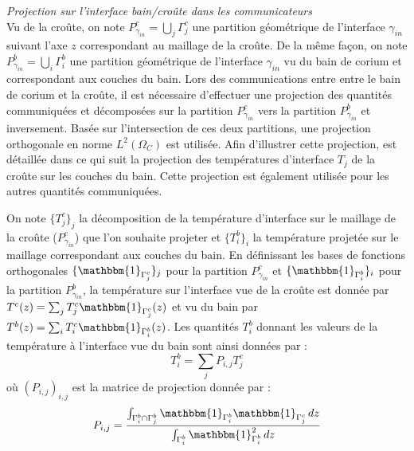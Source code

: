 {\it Projection sur l'interface bain/croûte dans les communicateurs}\\
Vu de la croûte, on note $P_{\gamma_{in}}^{c}=\displaystyle{\bigcup_j} \Gamma_j^c$ une partition géométrique de l'interface $\gamma_{in}$ suivant l'axe $z$ correspondant au maillage de la croûte. De la même façon, on note $P_{\gamma_{in}}^{b}=\displaystyle{\bigcup_i} \Gamma_i^b$ une partition géométrique de l'interface $\gamma_{in}$ vu du bain de corium et correspondant aux couches du bain. Lors des communications entre entre le bain de corium et la croûte, il est nécessaire d'effectuer une projection des quantités communiquées et décomposées sur la partition $P_{\gamma_{in}}^{c}$ vers la partition $P_{\gamma_{in}}^{b}$ et inversement. Basée sur l'intersection de ces deux partitions, une projection orthogonale en norme $L^2(\Omega_C)$ est utilisée. Afin d'illustrer cette projection, est détaillée dans ce qui suit la projection des températures d'interface $T_j$ de la croûte sur les couches du bain. Cette projection est également utilisée pour les autres quantités communiquées.

On note $\{T_j^c\}_j$ la décomposition de la température d'interface sur le maillage de la croûte ($P_{\gamma_{in}}^{c}$) que l'on souhaite projeter et $\{T_i^b\}_i$ la température projetée sur le maillage correspondant aux couches du bain.
En définissant les bases de fonctions orthogonales $\{{\mathbbm{1}}_{\Gamma_j^c}\}_j$ pour la partition $P_{\gamma_{in}}^{c}$ et  $\{{\mathbbm{1}}_{\Gamma_i^b}\}_i$ pour la partition $P_{\gamma{_{in}}}^{b}$, la température sur l'interface vue de la croûte est donnée par $T^c(z)=\sum_j {T_j^c {\mathbbm{1}}_{\Gamma_j^c}(z)}$ et vu du bain par  $T^b(z)=\sum_i {T_i^c {\mathbbm{1}}_{\Gamma_i^b}(z)}$.
Les quantités $T_i^b$ donnant les valeurs de la température à l'interface vue du bain sont ainsi données par : $$T_i^b=\sum_j P_{i,j} T_j^c$$ où $\left(P_{i,j}\right)_{i,j}$ est la matrice de projection donnée par : $$P_{i,j}=\frac{\int_{\Gamma_i^b\cap\Gamma_j^b}{\mathbbm{1}}_{\Gamma_i^b}{\mathbbm{1}}_{\Gamma_j^c}\, dz}{ \int_{\Gamma_i^b}{\mathbbm{1}}_{\Gamma_i^b}^2\, dz}$$


